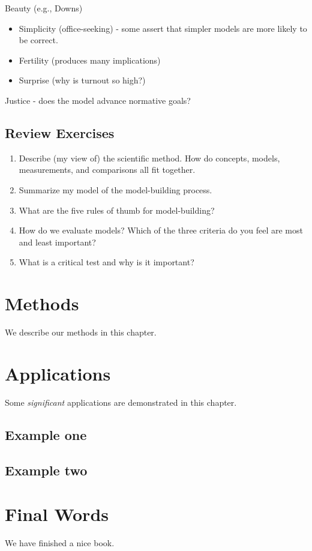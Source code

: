 \documentclass[]{book}
\providecommand{\tightlist}{%
  \setlength{\itemsep}{0pt}\setlength{\parskip}{0pt}}
\theoremstyle{definition}
\theoremstyle{definition}
\theoremstyle{definition}
\theoremstyle{remark}
\begin{document}
Beauty (e.g., Downs)

\begin{itemize}
\tightlist
\item
  Simplicity (office-seeking) - some assert that simpler models are more
  likely to be correct.
\item
  Fertility (produces many implications)
\item
  Surprise (why is turnout so high?)
\end{itemize}

Justice - does the model advance normative goals?

\section{Review Exercises}\label{review-exercises}

\begin{enumerate}
\def\labelenumi{\arabic{enumi}.}
\tightlist
\item
  Describe (my view of) the scientific method. How do concepts, models,
  measurements, and comparisons all fit together.
\item
  Summarize my model of the model-building process.
\item
  What are the five rules of thumb for model-building?
\item
  How do we evaluate models? Which of the three criteria do you feel are
  most and least important?
\item
  What is a critical test and why is it important?
\end{enumerate}

\chapter{Methods}\label{methods}

We describe our methods in this chapter.

\chapter{Applications}\label{applications}

Some \emph{significant} applications are demonstrated in this chapter.

\section{Example one}\label{example-one}

\section{Example two}\label{example-two}

\chapter{Final Words}\label{final-words}

We have finished a nice book.


\end{document}

